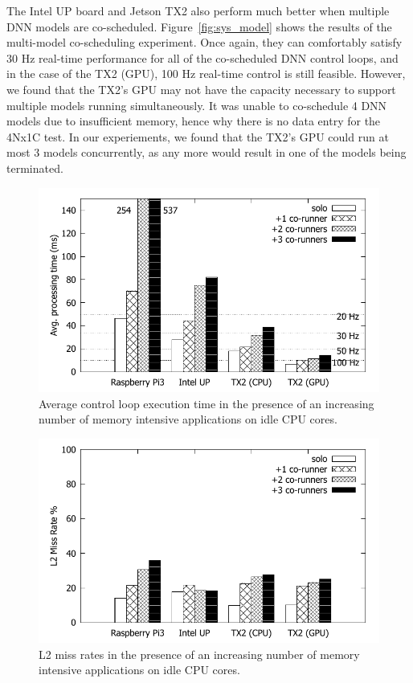 The Intel UP board and Jetson TX2 also perform much better when multiple DNN models
are co-scheduled. Figure~\ref{fig:sys_model} shows the results of the
multi-model co-scheduling experiment. Once again, they can comfortably
satisfy 30 Hz real-time performance for all of the co-scheduled DNN control
loops, and in the case of the TX2 (GPU), 100 Hz real-time control is still
feasible. However, we found that the TX2's GPU may not have the capacity
necessary to support multiple models running simultaneously. 
It was unable to co-schedule 4 DNN models due to insufficient memory, 
hence why there is no data entry for the 4Nx1C test. In our experiements,
we found that the TX2's GPU could run at most 3 models concurrently, as 
any more would result in one of the models being terminated.

\begin{figure}[h]
  \centering
  \includegraphics[width=.7\textwidth]{figs/compare_benchmark}
  \caption{Average control loop execution time in the presence of an
    increasing number of memory intensive applications on idle CPU cores.}
  \label{fig:sys_bench}
\end{figure} 

\begin{figure}[h]
  \centering
  \includegraphics[width=.7\textwidth]{figs/compare_l2missrate}
  \caption{L2 miss rates in the presence of an increasing number of 
			memory intensive applications on idle CPU cores.}
  \label{fig:sys_l2miss}
\end{figure}

